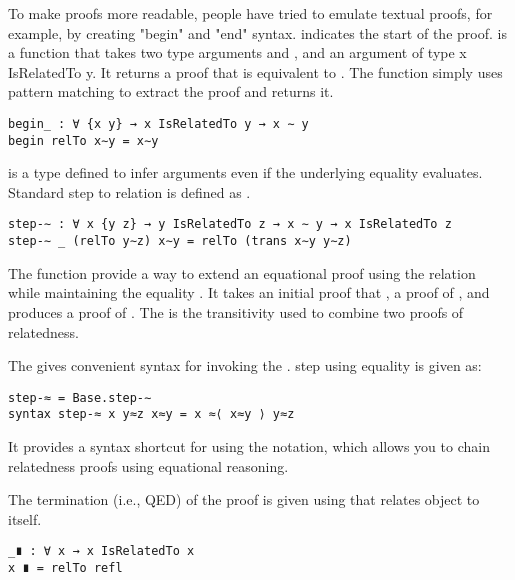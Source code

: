 To make proofs more readable, people have tried to emulate textual proofs, for
example, by creating "begin" and "end" syntax.  indicates the
start of the proof.  is a function that takes two type arguments
 and , and an argument of type x IsRelatedTo y. It returns a
proof that  is equivalent  to . The function
simply uses pattern matching to extract the proof  and returns it.

\begin{verbatim}
begin_ : ∀ {x y} → x IsRelatedTo y → x ∼ y
begin relTo x∼y = x∼y
\end{verbatim}

 is a type defined to infer arguments even if the underlying equality
evaluates. Standard step to relation is defined as .

\begin{verbatim}
step-∼ : ∀ x {y z} → y IsRelatedTo z → x ∼ y → x IsRelatedTo z
step-∼ _ (relTo y∼z) x∼y = relTo (trans x∼y y∼z)
\end{verbatim}

The  function provide a way to extend an equational proof using
the relation  while maintaining the equality .
It takes an initial proof that , a proof  of
, and produces a proof of . The
 is the transitivity used to combine two proofs of relatedness.

The  gives convenient syntax for invoking the .
step using equality is given as:

\begin{verbatim}
step-≈ = Base.step-∼
syntax step-≈ x y≈z x≈y = x ≈⟨ x≈y ⟩ y≈z
\end{verbatim}

It provides a syntax shortcut for using the  notation, which allows
you to chain relatedness proofs using equational reasoning.

The termination (i.e., QED) of the proof is given using  that relates
object to itself.

\begin{verbatim}
_∎ : ∀ x → x IsRelatedTo x
x ∎ = relTo refl
\end{verbatim}

